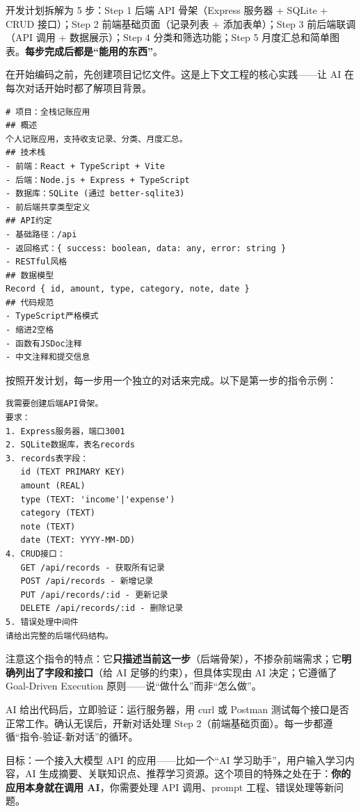 开发计划拆解为 5 步：Step 1 后端 API 骨架（Express 服务器 + SQLite + CRUD 接口）；Step 2 前端基础页面（记录列表 + 添加表单）；Step 3 前后端联调（API 调用 + 数据展示）；Step 4 分类和筛选功能；Step 5 月度汇总和简单图表。\textbf{每步完成后都是“能用的东西”}。


在开始编码之前，先创建项目记忆文件。这是上下文工程的核心实践——让 AI 在每次对话开始时都了解项目背景。

\begin{lstlisting}
# 项目：全栈记账应用
## 概述
个人记账应用，支持收支记录、分类、月度汇总。
## 技术栈
- 前端：React + TypeScript + Vite
- 后端：Node.js + Express + TypeScript
- 数据库：SQLite (通过 better-sqlite3)
- 前后端共享类型定义
## API约定
- 基础路径：/api
- 返回格式：{ success: boolean, data: any, error: string }
- RESTful风格
## 数据模型
Record { id, amount, type, category, note, date }
## 代码规范
- TypeScript严格模式
- 缩进2空格
- 函数有JSDoc注释
- 中文注释和提交信息
\end{lstlisting}


按照开发计划，每一步用一个独立的对话来完成。以下是第一步的指令示例：

\begin{lstlisting}
我需要创建后端API骨架。
要求：
1. Express服务器，端口3001
2. SQLite数据库，表名records
3. records表字段：
   id (TEXT PRIMARY KEY)
   amount (REAL)
   type (TEXT: 'income'|'expense')
   category (TEXT)
   note (TEXT)
   date (TEXT: YYYY-MM-DD)
4. CRUD接口：
   GET /api/records - 获取所有记录
   POST /api/records - 新增记录
   PUT /api/records/:id - 更新记录
   DELETE /api/records/:id - 删除记录
5. 错误处理中间件
请给出完整的后端代码结构。
\end{lstlisting}

注意这个指令的特点：它\textbf{只描述当前这一步}（后端骨架），不掺杂前端需求；它\textbf{明确列出了字段和接口}（给 AI 足够的约束），但具体实现由 AI 决定；它遵循了 Goal-Driven Execution 原则——说“做什么”而非“怎么做”。

AI 给出代码后，立即验证：运行服务器，用 curl 或 Postman 测试每个接口是否正常工作。确认无误后，开新对话处理 Step 2（前端基础页面）。每一步都遵循“指令-验证-新对话”的循环。



目标：一个接入大模型 API 的应用——比如一个“AI 学习助手”，用户输入学习内容，AI 生成摘要、关联知识点、推荐学习资源。这个项目的特殊之处在于：\textbf{你的应用本身就在调用 AI}，你需要处理 API 调用、prompt 工程、错误处理等新问题。

